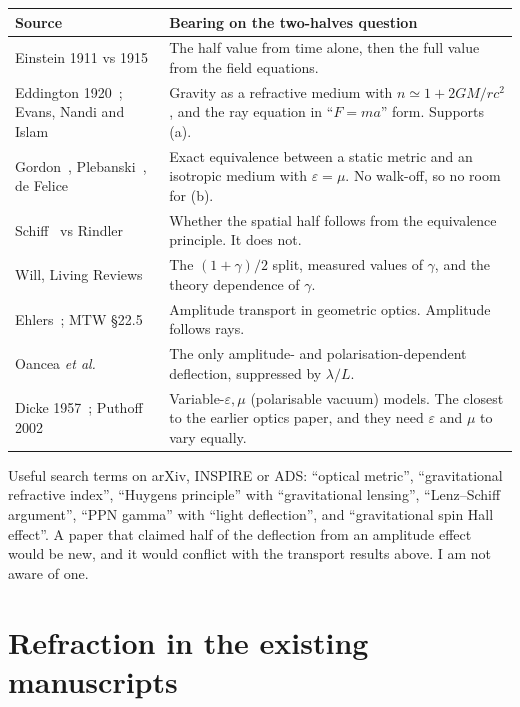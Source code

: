 \documentclass[11pt]{article}
\theoremstyle{plain}
\theoremstyle{remark}
\begin{document}
\begin{longtable}{@{}p{}p{}@{}}
\toprule
Source & Bearing on the two-halves question \\
\midrule
Einstein 1911 vs 1915~\cite{Einstein1911,Einstein1915} & The half value from time alone, then the full value from the field equations. \\
Eddington 1920~\cite{Eddington1920}; Evans, Nandi and Islam~\cite{Evans1996} & Gravity as a refractive medium with $n\simeq1+2GM/rc^2$, and the ray equation in ``$F=ma$'' form. Supports (a). \\
Gordon~\cite{Gordon1923}, Plebanski~\cite{Plebanski1960}, de Felice~\cite{deFelice1971} & Exact equivalence between a static metric and an isotropic medium with $\varepsilon=\mu$. No walk-off, so no room for (b). \\
Schiff~\cite{Schiff1960} vs Rindler~\cite{Rindler1968} & Whether the spatial half follows from the equivalence principle. It does not. \\
Will, Living Reviews~\cite{Will2014} & The $(1+\gamma)/2$ split, measured values of $\gamma$, and the theory dependence of $\gamma$. \\
Ehlers~\cite{Ehlers1967}; MTW \S22.5~\cite{MTW} & Amplitude transport in geometric optics. Amplitude follows rays. \\
Oancea \emph{et al.}~\cite{Oancea2020} & The only amplitude- and polarisation-dependent deflection, suppressed by $\lambda/L$. \\
Dicke 1957~\cite{Dicke1957}; Puthoff 2002~\cite{Puthoff2002} & Variable-$\varepsilon,\mu$ (polarisable vacuum) models. The closest to the earlier optics paper, and they need $\varepsilon$ and $\mu$ to vary equally. \\
\bottomrule
\end{longtable}

Useful search terms on arXiv, INSPIRE or ADS: ``optical metric'', ``gravitational refractive index'', ``Huygens principle'' with ``gravitational lensing'', ``Lenz--Schiff argument'', ``PPN gamma'' with ``light deflection'', and ``gravitational spin Hall effect''. A paper that claimed half of the deflection from an amplitude effect would be new, and it would conflict with the transport results above. I am not aware of one.

\section{Refraction in the existing manuscripts}
\label{sec:survey}
\end{document}
